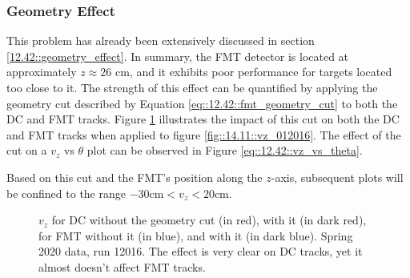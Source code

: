 \subsubsection{Geometry Effect}
\label{14.12::geometry_effect}
    This problem has already been extensively discussed in section \ref{12.42::geometry_effect}.
    In summary, the FMT detector is located at approximately $z \approx 26$ cm, and it exhibits poor performance for targets located too close to it.
    The strength of this effect can be quantified by applying the geometry cut described by Equation \eqref{eq::12.42::fmt_geometry_cut} to both the DC and FMT tracks.
    Figure \ref{fig::14.12::vz_012016_geomcut} illustrates the impact of this cut on both the DC and FMT tracks when applied to figure \ref{fig::14.11::vz_012016}.
    The effect of the cut on a $v_z$ vs $\theta$ plot can be observed in Figure \ref{eq::12.42::vz_vs_theta}.

    Based on this cut and the FMT's position along the $z$-axis, subsequent plots will be confined to the range $-30 \text{cm} < v_z < 20 \text{cm}$.

    \begin{figure}[h!]
        \centering{}
        \caption[$v_z$ for DC and FMT, w/ and w/out the geometry cut, run 12016]{$v_z$ for DC without the geometry cut (in red), with it (in dark red), for FMT without it (in blue), and with it (in dark blue). Spring 2020 data, run 12016. The effect is very clear on DC tracks, yet it almost doesn't affect FMT tracks.}
        \label{fig::14.12::vz_012016_geomcut}
    \end{figure}
